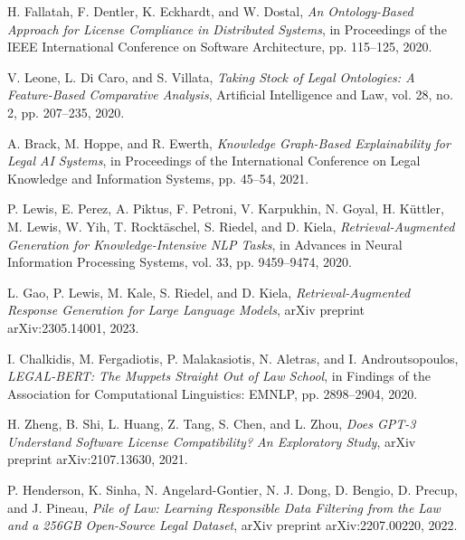 \documentclass[9pt,twocolumn]{article}
\begin{document}
\begin{thebibliography}{15}
H. Fallatah, F. Dentler, K. Eckhardt, and W. Dostal,
\textit{An Ontology-Based Approach for License Compliance in Distributed Systems},
in Proceedings of the IEEE International Conference on Software Architecture,
pp. 115--125, 2020.

V. Leone, L. Di Caro, and S. Villata,
\textit{Taking Stock of Legal Ontologies: A Feature-Based Comparative Analysis},
Artificial Intelligence and Law, vol. 28, no. 2, pp. 207--235, 2020.

A. Brack, M. Hoppe, and R. Ewerth,
\textit{Knowledge Graph-Based Explainability for Legal AI Systems},
in Proceedings of the International Conference on Legal Knowledge and Information Systems,
pp. 45--54, 2021.

P. Lewis, E. Perez, A. Piktus, F. Petroni, V. Karpukhin, N. Goyal, H. Küttler, M. Lewis, W. Yih, T. Rocktäschel, S. Riedel, and D. Kiela,
\textit{Retrieval-Augmented Generation for Knowledge-Intensive NLP Tasks},
in Advances in Neural Information Processing Systems,
vol. 33, pp. 9459--9474, 2020.

L. Gao, P. Lewis, M. Kale, S. Riedel, and D. Kiela,
\textit{Retrieval-Augmented Response Generation for Large Language Models},
arXiv preprint arXiv:2305.14001, 2023.

I. Chalkidis, M. Fergadiotis, P. Malakasiotis, N. Aletras, and I. Androutsopoulos,
\textit{LEGAL-BERT: The Muppets Straight Out of Law School},
in Findings of the Association for Computational Linguistics: EMNLP,
pp. 2898--2904, 2020.

H. Zheng, B. Shi, L. Huang, Z. Tang, S. Chen, and L. Zhou,
\textit{Does GPT-3 Understand Software License Compatibility? An Exploratory Study},
arXiv preprint arXiv:2107.13630, 2021.

P. Henderson, K. Sinha, N. Angelard-Gontier, N. J. Dong, D. Bengio, D. Precup, and J. Pineau,
\textit{Pile of Law: Learning Responsible Data Filtering from the Law and a 256GB Open-Source Legal Dataset},
arXiv preprint arXiv:2207.00220, 2022.

\end{thebibliography}
\end{document}
